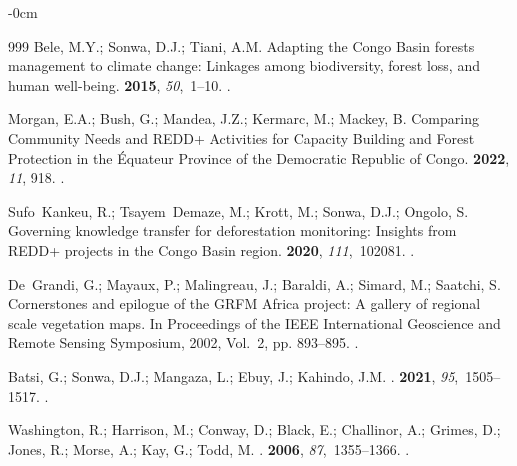 \documentclass[applsci,article,accept,pdftex,moreauthors]{Definitions/mdpi}
\begin{document}
\begin{adjustwidth}{-\extralength}{0cm}
\begin{thebibliography}{999}
Bele, M.Y.; Sonwa, D.J.; Tiani, A.M.
\newblock Adapting the Congo Basin forests management to climate change:
  Linkages among biodiversity, forest loss, and human well-being.
 {\bf 2015}, {\em 50},~1--10.
.

Morgan, E.A.; Bush, G.; Mandea, J.Z.; Kermarc, M.; Mackey, B.
\newblock Comparing Community Needs and REDD+ Activities for Capacity Building
  and Forest Protection in the Équateur Province of the Democratic Republic of
  Congo.
 {\bf 2022}, {\em 11}, 918.
.

Sufo~Kankeu, R.; Tsayem~Demaze, M.; Krott, M.; Sonwa, D.J.; Ongolo, S.
\newblock Governing knowledge transfer for deforestation monitoring: Insights
  from REDD+ projects in the Congo Basin region.
 {\bf 2020}, {\em 111},~102081.
.

De~Grandi, G.; Mayaux, P.; Malingreau, J.; Baraldi, A.; Simard, M.; Saatchi, S.
\newblock Cornerstones and epilogue of the GRFM Africa project: A gallery of
  regional scale vegetation maps.
\newblock In Proceedings of the IEEE International Geoscience and Remote
  Sensing Symposium,  2002, Vol.~2, pp. 893--895.
.

Batsi, G.; Sonwa, D.J.; Mangaza, L.; Ebuy, J.; Kahindo, J.M.
.
 {\bf 2021}, {\em 95},~1505--1517.
.

Washington, R.; Harrison, M.; Conway, D.; Black, E.; Challinor, A.; Grimes, D.;
  Jones, R.; Morse, A.; Kay, G.; Todd, M.
.
 {\bf 2006},
  {\em 87},~1355--1366.
.


\end{thebibliography}
\end{adjustwidth}
\end{document}
